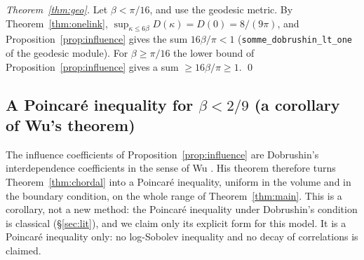 \documentclass[11pt,a4paper]{article}
\theoremstyle{remark}
\theoremstyle{definition}
\theoremstyle{plain}
\theoremstyle{remark}
\begin{document}
\emph{Theorem~\ref{thm:geo}.} Let $\beta<\pi/16$, and use the geodesic metric. By Theorem~\ref{thm:onelink},
$\sup_{\kappa\le6\beta}D(\kappa)=D(0)=8/(9\pi)$, and Proposition~\ref{prop:influence} gives the sum $16\beta/\pi<1$
(\texttt{somme\_dobrushin\_lt\_one} of the geodesic module). For $\beta\ge\pi/16$ the lower bound of
Proposition~\ref{prop:influence} gives a sum $\ge16\beta/\pi\ge1$. \qed

\subsection{A Poincar\'e inequality for $\beta<2/9$ (a corollary of Wu's theorem)}\label{sec:poincare}

The influence coefficients of Proposition~\ref{prop:influence} are Dobrushin's interdependence coefficients in the sense of Wu \cite[(2.3)]{Wu06}.
His theorem therefore turns Theorem~\ref{thm:chordal} into a Poincar\'e inequality, uniform in the volume and in the boundary condition, on the whole range of
Theorem~\ref{thm:main}. This is a corollary, not a new method: the Poincar\'e inequality under Dobrushin's condition is classical (\S\ref{sec:lit}), and we claim only
its explicit form for this model. It is a Poincar\'e inequality only: no log-Sobolev inequality and no decay of correlations is claimed.
\end{document}
